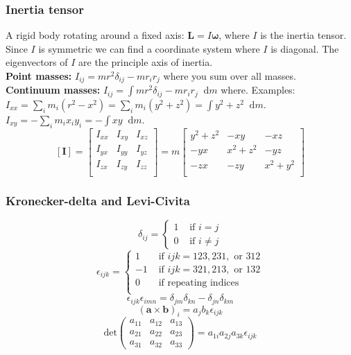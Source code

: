 \documentclass[a4paper, 10pt]{article}
\newcommand*\diff{\mathop{}\!\mathrm{d}}
\begin{document}
\begin{multicols*}{3}
\subsubsection*{Inertia tensor}
A rigid body rotating around a fixed axis: $\bm{L}=I\bm{\omega}$, where $I$ is the inertia tensor. Since $I$ is symmetric we can find a coordinate system where $I$ is diagonal. The eigenvectors of $I$ are the principle axis of inertia. \\
\textbf{Point masses:} $I_{ij} = mr^2\delta_{ij}-mr_ir_j$ where you sum over all masses.\\
\textbf{Continuum masses:} $I_{ij} = \int mr^2\delta_{ij}-mr_ir_j \diff m$ where. Examples:\\
$I_{xx} = \sum_i m_i(r^2 -x^2) = \sum_i m_i(y^2 + z^2) = \int y^2 + z^2 \diff m$.\\
$I_{xy} = -\sum_{i}m_ix_iy_i = - \int xy \diff m$.
\[
[\mathbf{I}]=\left[\begin{matrix}
I_{xx} & I_{xy} & I_{xz} \\
I_{yx} & I_{yy} & I_{yz} \\
I_{zx} & I_{zy} & I_{zz} \\
\end{matrix}\right]
=m\left[\begin{matrix}
y^2+z^2 & -xy & -xz \\
-yx & x^2+z^2 & -yz \\
-zx & -zy & x^2+y^2 \\
\end{matrix}\right]
\]
\subsubsection*{Kronecker-delta and Levi-Civita}

\[
\delta_{ij}=\begin{cases}
1 & \mbox{ if } i=j \\
0 & \mbox{ if } i\neq j
\end{cases}\]
\[
\epsilon_{ijk}=\begin{cases}
1 & \mbox{ if } ijk=123,231, \mbox{ or } 312 \\
-1 & \mbox{ if } ijk=321,213, \mbox{ or } 132 \\
0 & \mbox{ if repeating indices} \\
\end{cases}
\]
\[
\epsilon_{ijk}\epsilon_{imn}=\delta_{jm}\delta_{kn}-\delta_{jn}\delta_{km}
\]
$$(\mathbf{a}\times \mathbf{b})_i = a_j b_k \epsilon_{ijk}$$
\[
\mbox{det}\left(\begin{matrix}
a_{11} & a_{12} & a_{13} \\
a_{21} & a_{22} & a_{23} \\
a_{31} & a_{32} & a_{33}
\end{matrix}\right)=a_{1i}a_{2j}a_{3k}\epsilon_{ijk}
\]


\end{multicols*}
\end{document}
